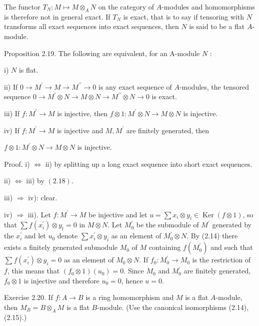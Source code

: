 \documentclass{standalone}
\theoremstyle{definition}
\theoremstyle{remark}
\begin{document}
The functor $T_{N}: M \mapsto M \otimes_{A} N$ on the category of $A$-modules and homomorphisms is therefore not in general exact. If $T_{N}$ is exact, that is to say if tensoring with $N$ transforms all exact sequences into exact sequences, then $N$ is said to be a flat $A$-module.

Proposition 2.19. The following are equivalent, for an A-module $N$ :

i) $N$ is flat.

ii) If $0 \rightarrow M^{\prime} \rightarrow M \rightarrow M^{\prime \prime} \rightarrow 0$ is any exact sequence of $A$-modules, the tensored sequence $0 \rightarrow M^{\prime} \otimes N \rightarrow M \otimes N \rightarrow M^{\prime \prime} \otimes N \rightarrow 0$ is exact.

iii) If $f: M^{\prime} \rightarrow M$ is injective, then $f \otimes 1: M^{\prime} \otimes N \rightarrow M \otimes N$ is injective.

iv) If $f: M^{\prime} \rightarrow M$ is injective and $M, M^{\prime}$ are finitely generated, then

$f \otimes 1: M^{\prime} \otimes N \rightarrow M \otimes N$ is injective.

Proof. i) $\Leftrightarrow$ ii) by splitting up a long exact sequence into short exact sequences.

ii) $\Leftrightarrow$ iii) by $(2.18)$.

iii) $\Rightarrow$ iv): clear.

iv) $\Rightarrow$ iii). Let $f: M^{\prime} \rightarrow M$ be injective and let $u=\sum x_{i} \otimes y_{i} \in \operatorname{Ker}(f \otimes 1)$, so that $\sum f\left(x_{i}^{\prime}\right) \otimes y_{t}=0$ in $M \otimes N$. Let $M_{0}^{\prime}$ be the submodule of $M^{\prime}$ generated by the $x_{i}^{\prime}$ and let $u_{0}$ denote $\sum x_{i}^{\prime} \otimes y_{i}$ as an element of $M_{0}^{\prime} \otimes N$. By (2.14) there exists a finitely generated submodule $M_{0}$ of $M$ containing $f\left(M_{0}^{\prime}\right)$ and such that $\sum f\left(x_{i}^{\prime}\right) \otimes y_{i}=0$ as an element of $M_{0} \otimes N$. If $f_{0}: M_{0}^{\prime} \rightarrow M_{0}$ is the restriction of $f$, this means that $\left(f_{0} \otimes 1\right)\left(u_{0}\right)=0$. Since $M_{0}$ and $M_{0}^{\prime}$ are finitely generated, $f_{0} \otimes 1$ is injective and therefore $u_{0}=0$, hence $u=0$.

Exercise 2.20. If $f: A \rightarrow B$ is a ring homomorphism and $M$ is a flat $A$-module, then $M_{B}=B \otimes_{A} M$ is a flat $B$-module. (Use the canonical isomorphisms (2.14), (2.15).)
\end{document}
